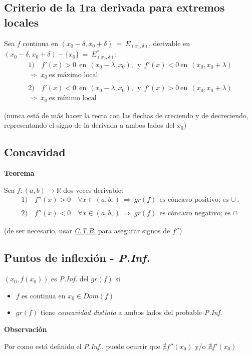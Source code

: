 \documentclass[11pt,titlepage]{article}
\newcommand{\littleTitle}[1]{
	\noindent \ignorespaces
	\small \textbf{#1} \normalsize
	\ignorespaces \ignorespacesafterend
}
\begin{document}
\subsection{Criterio de la 1ra derivada para extremos locales}
Sea $f$ continua en $(x_0 - \delta, x_0 + \delta) \ = \ E_{(x_0,\delta)}$, derivable en %
$(x_0 - \delta, x_0 + \delta) - \{x_0\} \ = \ E^{*}_{(x_0,\delta)}$:
\begin{gather*}
	1) \quad f'(x) > 0 \ \ \text{en} \ \ (x_0 - \lambda, x_0), \ \ \text{y} \ \ f'(x) < 0 \ \text{en} \ \ (x_0, x_0 + \lambda) \\
	\Rightarrow \ x_0 \ \text{es máximo local} \\ \\
	2) \quad f'(x) < 0 \ \ \text{en} \ \ (x_0 - \lambda, x_0), \ \ \text{y} \ \ f'(x) > 0 \ \text{en} \ \ (x_0, x_0 + \lambda) \\
	\Rightarrow \ x_0 \ \text{es mínimo local}
\end{gather*}
\begin{center}
	\footnotesize(nunca está de más hacer la recta con las flechas de creciendo y de decreciendo, representando %
	el signo de la derivada a ambos lados del $x_0$)
\end{center}
	 
\subsection{Concavidad}
\littleTitle{Teorema} \par
Sea $f: (a,b) \to \mathbb{R}$ dos veces derivable:
\begin{gather*}
	1) \quad f''(x) > 0 \quad \forall x \in (a,b,) \ \Rightarrow \ gr(f) \ \text{es cóncavo positivo; es $\cup$}. \\ \\ 
	2) \quad f''(x) < 0 \quad \forall x \in (a,b,) \ \Rightarrow \ gr(f) \ \text{es cóncavo negativo; es $\cap$}
\end{gather*}
\begin{center}
	\footnotesize (de ser necesario, usar \hyperref[ctb]{\emph{C.T.B.}} para asegurar signos de $f''$)
\end{center}

\subsection{Puntos de inflexión - \emph{P.Inf.}}
$(x_0, f(x_0))$ es \emph{P.Inf.} del $gr(f)$ si
\begin{itemize}
	\item $f$ es continua en $x_0 \in Dom(f)$
	\item $gr(f)$ tiene \emph{concavidad distinta} a ambos lados del probable \emph{P.Inf.}
\end{itemize}
\littleTitle{Observación} \par
Por como está definido el \emph{P.Inf.}, puede ocurrir que $\nexists f''(x_0)$ y/o $\nexists f'(x_0)$
\end{document}

